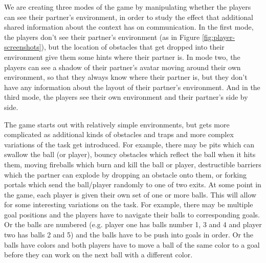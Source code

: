 
We are creating three modes of the game by manipulating whether the
players can see their partner's environment, in order to study the
effect that additional shared information about the context has on
communication.  In the first mode, the players don't see their
partner's environment (as in Figure \ref{fig:player-screenshots}), but
the location of obstacles that get dropped into their environment give
them some hints where their partner is. In mode two, the players can
see a shadow of their partner's avatar moving around their own
environment, so that they always know where their partner is, but they
don't have any information about the layout of their partner's
environment. And in the third mode, the players see their
own environment and their partner's side by side.



The game starts out with relatively simple environments, but gets more
complicated as additional kinds of obstacles and traps and more
complex variations of the task get introduced.  For example, there may
be pits which can swallow the ball (or player), bouncy obstacles which
reflect the ball when it hits them, moving fireballs which burn and
kill the ball or player, destructible barriers which the partner can
explode by dropping an obstacle onto them, or forking portals which
send the ball/player randomly to one of two exits.  At some point in
the game, each player is given their own set of one or more balls. This
will allow for some interesting variations on the task. For example,
there may be multiple goal positions and the players have to navigate
their balls to corresponding goals. Or the balls are numbered
(e.g. player one has balls number 1, 3 and 4 and player two has balls
2 and 5) and the balls have to be push into goals in order. Or the
balls have colors and both players have to move a ball of the same
color to a goal before they can work on the next ball with a different
color.
